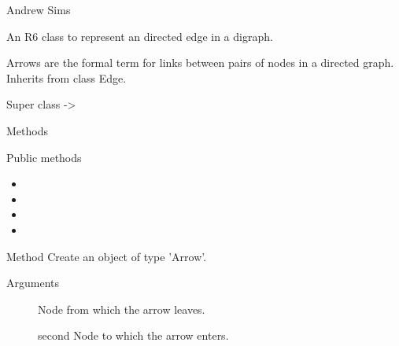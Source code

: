 \documentclass[a4paper]{book}
\begin{document}
%
\begin{Author}\relax
Andrew Sims 
\end{Author}
%
\begin{Description}\relax
An R6 class to represent an directed edge in a digraph.
\end{Description}
%
\begin{Details}\relax
Arrows are the formal term for links between pairs of nodes in a
directed graph. Inherits from class Edge.
\end{Details}
%
\begin{Section}{Super class}
 -> 
\end{Section}
%
\begin{Section}{Methods}
%
\begin{SubSection}{Public methods}
\begin{itemize}

\item{} 
\item{} 
\item{} 
\item{} 

\end{itemize}

\end{SubSection}




\hypertarget{method-new}{}
%
\begin{SubSection}{Method }
Create an object of type 'Arrow'.
%


%
\begin{SubSubSection}{Arguments}

\begin{description}

\item[] Node from which the arrow leaves.

\item[] second Node to which the arrow enters.


\end{description}
\end{SubSubSection}
\end{SubSection}
\end{Section}
\end{document}
